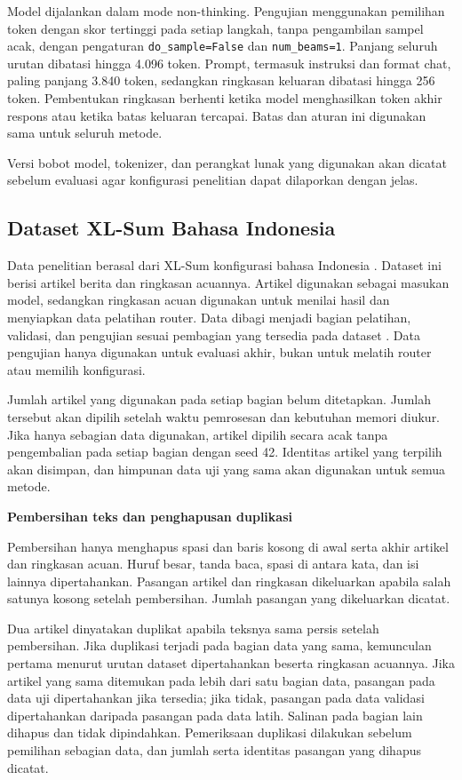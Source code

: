 Model dijalankan dalam mode non-thinking. Pengujian menggunakan pemilihan token dengan skor tertinggi pada setiap langkah, tanpa pengambilan sampel acak, dengan pengaturan \texttt{do\_sample=False} dan \texttt{num\_beams=1}. Panjang seluruh urutan dibatasi hingga 4.096 token. Prompt, termasuk instruksi dan format chat, paling panjang 3.840 token, sedangkan ringkasan keluaran dibatasi hingga 256 token. Pembentukan ringkasan berhenti ketika model menghasilkan token akhir respons atau ketika batas keluaran tercapai. Batas dan aturan ini digunakan sama untuk seluruh metode.

Versi bobot model, tokenizer, dan perangkat lunak yang digunakan akan dicatat sebelum evaluasi agar konfigurasi penelitian dapat dilaporkan dengan jelas.

\subsection{Dataset XL-Sum Bahasa Indonesia}

Data penelitian berasal dari XL-Sum konfigurasi bahasa Indonesia \citep{xlsumDatasetCard}. Dataset ini berisi artikel berita dan ringkasan acuannya. Artikel digunakan sebagai masukan model, sedangkan ringkasan acuan digunakan untuk menilai hasil dan menyiapkan data pelatihan router. Data dibagi menjadi bagian pelatihan, validasi, dan pengujian sesuai pembagian yang tersedia pada dataset \citep{xlsumRepository}. Data pengujian hanya digunakan untuk evaluasi akhir, bukan untuk melatih router atau memilih konfigurasi.

Jumlah artikel yang digunakan pada setiap bagian belum ditetapkan. Jumlah tersebut akan dipilih setelah waktu pemrosesan dan kebutuhan memori diukur. Jika hanya sebagian data digunakan, artikel dipilih secara acak tanpa pengembalian pada setiap bagian dengan seed 42. Identitas artikel yang terpilih akan disimpan, dan himpunan data uji yang sama akan digunakan untuk semua metode.

\medskip
\noindent\textbf{Pembersihan teks dan penghapusan duplikasi}\par\smallskip

Pembersihan hanya menghapus spasi dan baris kosong di awal serta akhir artikel dan ringkasan acuan. Huruf besar, tanda baca, spasi di antara kata, dan isi lainnya dipertahankan. Pasangan artikel dan ringkasan dikeluarkan apabila salah satunya kosong setelah pembersihan. Jumlah pasangan yang dikeluarkan dicatat.

Dua artikel dinyatakan duplikat apabila teksnya sama persis setelah pembersihan. Jika duplikasi terjadi pada bagian data yang sama, kemunculan pertama menurut urutan dataset dipertahankan beserta ringkasan acuannya. Jika artikel yang sama ditemukan pada lebih dari satu bagian data, pasangan pada data uji dipertahankan jika tersedia; jika tidak, pasangan pada data validasi dipertahankan daripada pasangan pada data latih. Salinan pada bagian lain dihapus dan tidak dipindahkan. Pemeriksaan duplikasi dilakukan sebelum pemilihan sebagian data, dan jumlah serta identitas pasangan yang dihapus dicatat.

